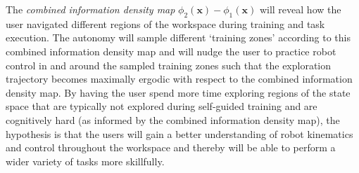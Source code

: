 \documentclass[12pt]{article}
\begin{document}
The \textit{combined information density map}  $\phi_{2}(\boldsymbol{x}) - \phi_{1}(\boldsymbol{x})$ will reveal how the user navigated different regions of the workspace during training and task execution. The autonomy will sample different `training zones' according to this combined information density map and will nudge the user to practice robot control in and around the sampled training zones such that the exploration trajectory becomes maximally ergodic with respect to the combined information density map. By having the user spend more time exploring regions of the state space that are typically not explored during self-guided training and are cognitively hard (as informed by the combined information density map), the hypothesis is that the users will gain a better understanding of robot kinematics and control throughout the workspace and thereby will be able to perform a wider variety of tasks more skillfully. 
% 
%
%
%
%
%
%
\end{document}

